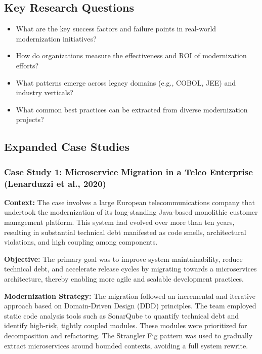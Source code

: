 \documentclass[12pt]{article}
\begin{document}
\subsection{Key Research Questions}

\begin{itemize}
    \item What are the key success factors and failure points in real-world modernization initiatives?
    \item How do organizations measure the effectiveness and ROI of modernization efforts?
    \item What patterns emerge across legacy domains (e.g., COBOL, JEE) and industry verticals?
    \item What common best practices can be extracted from diverse modernization projects?
\end{itemize}


\subsection{Expanded Case Studies}

\subsubsection{Case Study 1: Microservice Migration in a Telco Enterprise (Lenarduzzi et al., 2020)}

\textbf{Context:}  
The case involves a large European telecommunications company that undertook the modernization of its long-standing Java-based monolithic customer management platform. This system had evolved over more than ten years, resulting in substantial technical debt manifested as code smells, architectural violations, and high coupling among components.

\textbf{Objective:}  
The primary goal was to improve system maintainability, reduce technical debt, and accelerate release cycles by migrating towards a microservices architecture, thereby enabling more agile and scalable development practices.

\textbf{Modernization Strategy:}  
The migration followed an incremental and iterative approach based on Domain-Driven Design (DDD) principles. The team employed static code analysis tools such as SonarQube to quantify technical debt and identify high-risk, tightly coupled modules. These modules were prioritized for decomposition and refactoring. The Strangler Fig pattern was used to gradually extract microservices around bounded contexts, avoiding a full system rewrite.
\end{document}
